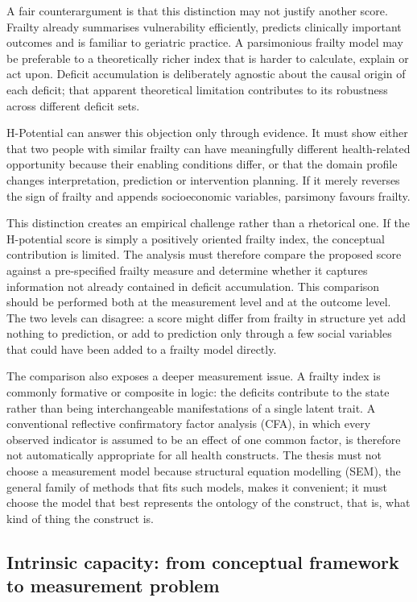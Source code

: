 A fair counterargument is that this distinction may not justify another score.
Frailty already summarises vulnerability efficiently, predicts clinically
important outcomes and is familiar to geriatric practice. A parsimonious
frailty model may be preferable to a theoretically richer index that is harder
to calculate, explain or act upon. Deficit accumulation is deliberately
agnostic about the causal origin of each deficit; that apparent theoretical
limitation contributes to its robustness across different deficit sets.

H-Potential can answer this objection only through evidence. It must show either
that two people with similar frailty can have meaningfully different
health-related opportunity because their enabling conditions differ, or that
the domain profile changes interpretation, prediction or intervention planning.
If it merely reverses the sign of frailty and appends socioeconomic variables,
parsimony favours frailty.

This distinction creates an empirical challenge rather than a rhetorical one. If the H-potential score is simply a positively oriented frailty index, the conceptual contribution is limited. The analysis must therefore compare the proposed score against a pre-specified frailty measure and determine whether it captures information not already contained in deficit accumulation. This comparison should be performed both at the measurement level and at the outcome level. The two levels can disagree: a score might differ from frailty in structure yet add nothing to prediction, or add to prediction only through a few social variables that could have been added to a frailty model directly.

The comparison also exposes a deeper measurement issue. A frailty index is commonly formative or composite in logic: the deficits contribute to the state rather than being interchangeable manifestations of a single latent trait. A conventional reflective confirmatory factor analysis (CFA), in which every observed indicator is assumed to be an effect of one common factor, is therefore not automatically appropriate for all health constructs. The thesis must not choose a measurement model because structural equation modelling (SEM), the general family of methods that fits such models, makes it convenient; it must choose the model that best represents the ontology of the construct, that is, what kind of thing the construct is.

\subsection{Intrinsic capacity: from conceptual framework to measurement problem}

